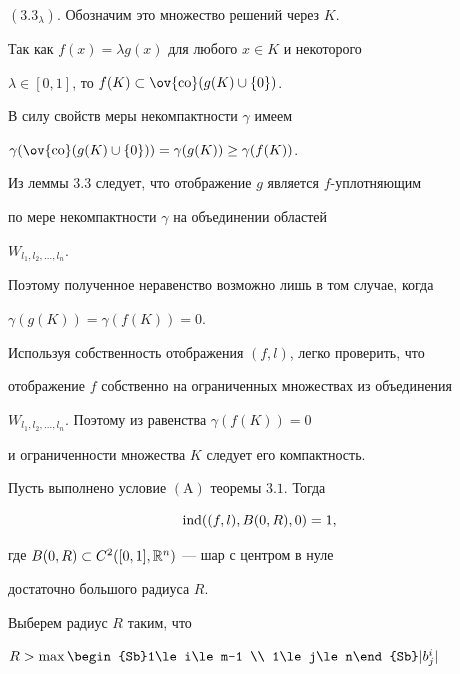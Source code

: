 \begin{pf}
\begin{pf}
$(3.3_\lambda)$. Обозначим это множество решений через $K$.


Так как $f(x) = \lambda g(x)$ для любого $x\in K$ и некоторого 


$\lambda \in [0,1]$, то $f(K) \subset \ov{\co}(g(K)\cup \{0\})$.


В силу свойств меры некомпактности $\gamma$ имеем


$\gamma(\ov{\co}(g(K)\cup \{0\}))=\gamma (g(K))\geq \gamma (f(K))$.


Из леммы 3.3 следует, что отображение $g$ является $f$-уплотняющим 


по мере некомпактности $\gamma$ на объединении областей 


$W_{l_1, l_2, \dotsc, l_n}$.


Поэтому полученное неравенство возможно лишь в том случае, когда


$\gamma (g(K))=\gamma(f(K))=0$.


Используя собственность отображения $(f, l)$, легко проверить, что


отображение $f$ собственно на ограниченных множествах из объединения


$W_{l_1, l_2, \dotsc, l_n}$. Поэтому из равенства $\gamma (f(K))=0$


и ограниченности множества $K$ следует его компактность.


\end{pf}





\begin{lems}


Пусть выполнено условие $\mathrm{(A)}$ теоремы $3.1$. Тогда 


$$


\Ind ((f, l), B(0, R), 0)=1,


$$


где $B(0, R)\subset C^2([0,1], {\Bbb R}^n)$ --- шар с центром в нуле


достаточно большого радиуса $R$.


\end{lems}





\begin{pf}


Выберем радиус $R$ таким, что


$R>\max\limits\begin{Sb}1\le i\le m-1 \\ 1\le j\le n\end{Sb} |b_j^i|$



\end{pf}
\end{pf}
